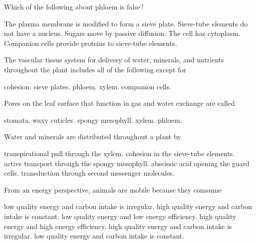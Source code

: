 
\question

\begin{choices}
\correctchoice  %
\choice  %
\choice  %
\choice  %
\choice  %
\end{choices}


\question
Which of the following about phloem is false?

\begin{choices}
\correctchoice The plasma membrane is modified to form a sieve plate. %
\choice Sieve-tube elements do not have a nucleus. %
\choice Sugars move by passive diffusion. %
\choice The cell has cytoplasm. %
\choice Companion cells provide proteins to sieve-tube elements. %
\end{choices}



\question
The vascular tissue system for delivery of water, minerals, and nutrients throughout the plant includes all of the following except for

\begin{choices}
\correctchoice cohesion. %
\choice sieve plates. %
\choice phloem. %
\choice xylem. %
\choice companion cells. %
\end{choices}

\question
Pores on the leaf surface that function in gas and water exchange are called

\begin{choices}
\correctchoice stomata. %
\choice waxy cuticles. %
\choice spongy mesophyll. %
\choice xylem. %
\choice phloem. %
\end{choices}

\question
Water and minerals are distributed throughout a plant by 

\begin{choices}
\correctchoice transpirational pull through the xylem. %
\choice cohesion in the sieve-tube elements. %
\choice active transport through the spongy mesophyll. %
\choice abscissic acid opening the guard cells. %
\choice transduction through second messenger molecules. %
\end{choices}

\question
From an energy perspective, animals are mobile because they comsume

\begin{choices}
\correctchoice low quality energy and carbon intake is irregular.%
\choice high quality energy and carbon intake is constant. %
\choice low quality energy and low energy efficiency.%
\choice high quality energy and high energy efficiency. %
\choice high quality energy and carbon intake is irregular. %
\choice low quality energy and carbon intake is constant. %
\end{choices}


